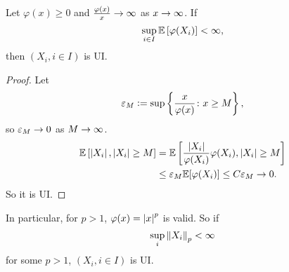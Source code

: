 \begin{thm}
    Let $\varphi(x) \geq 0$ and $\frac{\varphi(x)}{x} \rightarrow \infty$ as $x \rightarrow \infty$. If
    \begin{equation*}
        \sup_{i \in I} \mathbb{E}\left[\varphi(X_i)\right] < \infty,
    \end{equation*}
    then $(X_i,i\in I)$ is UI.
\end{thm}
\begin{proof}
    Let
    \begin{equation*}
        \varepsilon_M \vcentcolon= \sup\left\{\frac{x}{\varphi(x)} \colon x \geq M\right\},
    \end{equation*}
    so $\varepsilon_M \rightarrow 0$ as $M \rightarrow \infty$.
    \begin{equation*}
        \begin{aligned}
            \mathbb{E}\left[\left\lvert X_i\right\lvert,\left\lvert X_i\right\lvert \geq M\right] &= \mathbb{E}\left[\frac{\left\lvert X_i\right\lvert}{\varphi(X_i)}\varphi(X_i),\left\lvert X_i\right\lvert \geq M\right] \\
            &\leq \varepsilon_M \mathbb{E}[\varphi(X_i)] \leq C\varepsilon_M \rightarrow 0.
        \end{aligned}
    \end{equation*}
    So it is UI.
\end{proof}
\begin{rmk}
    In particular, for $p > 1$, $\varphi(x) = \left\lvert x\right\lvert^p$ is valid. So if 
    \begin{equation*}
        \sup_i \left\lVert X_i\right\lVert_p < \infty
    \end{equation*}
    for some $p > 1$, $(X_i,i\in I)$ is UI.
\end{rmk}

